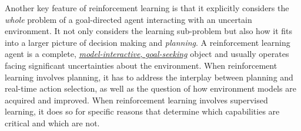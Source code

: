 \documentclass[11pt]{article}
\begin{document}
Another key feature of reinforcement learning is that it explicitly considers the \emph{whole} problem of a goal-directed agent interacting with an uncertain environment. It not only considers the learning sub-problem but also how it fits into a larger picture of decision making and \emph{planning}. A reinforcement learning agent is a complete, \underline{\emph{model-interactive}, \emph{goal-seeking}} object and usually operates facing significant uncertainties about the environment. When reinforcement learning involves planning, it has to address the interplay between planning and real-time action selection, as well as the question of how environment models are acquired and improved. When reinforcement learning involves supervised learning, it does so for specific reasons that determine which capabilities are critical and which are not. 
\end{document}
